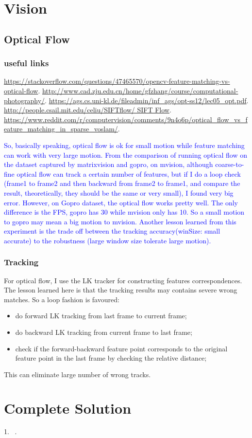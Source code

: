 \documentclass[a4paper]{report}
\begin{document}
\chapter{Vision}
\section{Optical Flow}
\subsection{useful links}
\url{https://stackoverflow.com/questions/47465570/opencv-feature-matching-vs-optical-flow}.
\url{http://www.cad.zju.edu.cn/home/gfzhang/course/computational-photography/}.
\url{https://ags.cs.uni-kl.de/fileadmin/inf_ags/opt-ss12/lec05_opt.pdf}.
\url{http://people.csail.mit.edu/celiu/SIFTflow/ SIFT Flow}.
\url{https://www.reddit.com/r/computervision/comments/9n4o6p/optical_flow_vs_feature_matching_in_sparse_voslam/}.

\textcolor{blue}{So, basically speaking, optical flow is ok for small motion while feature matching can work with very large motion. From the comparison of running optical flow on the dataset captured by matrixvision and gopro, on mvision, although coarse-to-fine optical flow can track a certain number of features, but if I do a loop check (frame1 to frame2 and then backward from frame2 to frame1, and compare the result, theoretically, they should be the same or very small), I found very big error. However, on Gopro dataset, the optical flow works pretty well. The only difference is the FPS, gopro has 30 while mvision only has 10. So a small motion to gopro may mean a big motion to mvision. Another lesson learned from this experiment is the trade off between the tracking accuracy(winSize: small accurate) to the robustness (large window size tolerate large motion).}

\subsection{Tracking}
For optical flow, I use the LK tracker for constructing features correspondences. The lesson learned here is that the tracking results may contains severe wrong matches. So a loop fashion is favoured: 
\begin{itemize}
	\item do forward LK tracking from last frame to current frame;
	\item do backward LK tracking from current frame to last frame;
	\item check if the forward-backward feature point corresponds to the original feature point in the last frame by checking the relative distance; 
\end{itemize}
This can eliminate large number of wrong tracks.

\chapter{Complete Solution}
1. ~\cite{schmidt2005calibration}.

 

\end{document}
